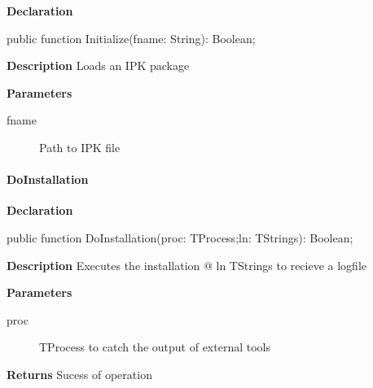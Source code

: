\documentclass{report}
\newif\ifpdf
\begin{document}
\label{ipkhandle.TInstallation-Initialize}
\begin{list}{}{
\setlength{\itemindent}{0cm}
\setlength{\listparindent}{0cm}
\setlength{\leftmargin}{\evensidemargin}
\addtolength{\leftmargin}{\tmplength}
\settowidth{\labelsep}{X}
\addtolength{\leftmargin}{\labelsep}
\setlength{\labelwidth}{\tmplength}
}
\item[\textbf{Declaration}\hfill]
\ifpdf
\begin{flushleft}
\fi
\begin{ttfamily}
public function Initialize(fname: String): Boolean;\end{ttfamily}

\ifpdf
\end{flushleft}
\fi

\par
\item[\textbf{Description}]
Loads an IPK package \par
\item[\textbf{Parameters}]
\begin{description}
\item[fname] Path to IPK file
\end{description}


\end{list}
\paragraph*{DoInstallation}\hspace*{\fill}

\label{ipkhandle.TInstallation-DoInstallation}
\begin{list}{}{
\setlength{\itemindent}{0cm}
\setlength{\listparindent}{0cm}
\setlength{\leftmargin}{\evensidemargin}
\addtolength{\leftmargin}{\tmplength}
\settowidth{\labelsep}{X}
\addtolength{\leftmargin}{\labelsep}
\setlength{\labelwidth}{\tmplength}
}
\item[\textbf{Declaration}\hfill]
\ifpdf
\begin{flushleft}
\fi
\begin{ttfamily}
public function DoInstallation(proc: TProcess;ln: TStrings): Boolean;\end{ttfamily}

\ifpdf
\end{flushleft}
\fi

\par
\item[\textbf{Description}]
Executes the installation  @ ln TStrings to recieve a logfile \par
\item[\textbf{Parameters}]
\begin{description}
\item[proc] TProcess to catch the output of external tools
\end{description}
\item[\textbf{Returns}]Sucess of operation


\end{list}
\end{document}
